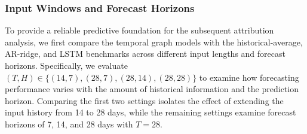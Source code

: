 \documentclass[preprint,authoryear,11pt]{elsarticle}
\theoremstyle{definition}
\begin{document}
\subsubsection{Input Windows and Forecast Horizons}
\label{subsubsec:multi_horizon_results}

To provide a reliable predictive foundation for the subsequent attribution analysis, we first compare the temporal graph models with the historical-average, AR-ridge, and LSTM benchmarks across different input lengths and forecast horizons.
Specifically, we evaluate \((T,H)\in\{(14,7),(28,7),(28,14),(28,28)\}\) to examine how forecasting performance varies with the amount of historical information and the prediction horizon.
Comparing the first two settings isolates the effect of extending the input history from 14 to 28 days, while the remaining settings examine forecast horizons of 7, 14, and 28 days with \(T=28\).
\end{document}
